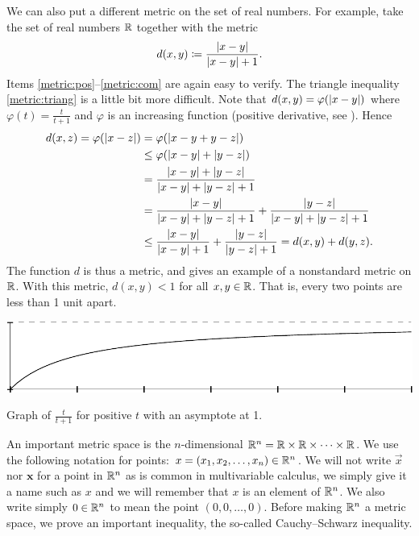 \begin{example}
We can also put a different metric on the set of real numbers.
For example, take the set of real numbers ${\mathbb{R}}$ together with the metric
\begin{equation*}
d(x,y) \coloneqq
\frac{\left\lvert {x-y} \right\rvert}{\left\lvert {x-y} \right\rvert+1} .
\end{equation*}
Items \ref{metric:pos}--\ref{metric:com} are again easy to verify.  The
triangle inequality \ref{metric:triang} is a little bit more difficult.
Note that $d(x,y) = \varphi(\left\lvert {x-y} \right\rvert)$ where $\varphi(t) =
\frac{t}{t+1}$ and $\varphi$ is an increasing function
(positive derivative, see ).
Hence
\begin{equation*}
\begin{split}
d(x,z) = \varphi(\left\lvert {x-z} \right\rvert)
& = 
\varphi(\left\lvert {x-y+y-z} \right\rvert) \\
& \leq
\varphi(\left\lvert {x-y} \right\rvert+\left\lvert {y-z} \right\rvert)
\\
& =
\frac{\left\lvert {x-y} \right\rvert+\left\lvert {y-z} \right\rvert}{\left\lvert {x-y} \right\rvert+\left\lvert {y-z} \right\rvert+1} \\
& =
\frac{\left\lvert {x-y} \right\rvert}{\left\lvert {x-y} \right\rvert+\left\lvert {y-z} \right\rvert+1} +
\frac{\left\lvert {y-z} \right\rvert}{\left\lvert {x-y} \right\rvert+\left\lvert {y-z} \right\rvert+1}
\\
& \leq
\frac{\left\lvert {x-y} \right\rvert}{\left\lvert {x-y} \right\rvert+1} +
\frac{\left\lvert {y-z} \right\rvert}{\left\lvert {y-z} \right\rvert+1} =
d(x,y)+ d(y,z) .
\end{split}
\end{equation*}
The function $d$ is thus a metric, and gives
an example of a nonstandard metric on ${\mathbb{R}}$.  With this metric,
$d(x,y) < 1$ for all $x,y \in {\mathbb{R}}$.  That is,
every two points are less than 1 unit apart.
\begin{myfigureht}
\includegraphics{figures/tovertp1graph}
\caption{Graph of $\frac{t}{t+1}$ for positive $t$ with an asymptote at 1.\label{fig:tovertp1}}
\end{myfigureht}
\end{example}

An important metric space is the
$n$-dimensional \emph{}
${\mathbb{R}}^n = {\mathbb{R}} \times {\mathbb{R}} \times \cdots \times {\mathbb{R}}$.   We use the following
notation for points: $x =(x_1,x_2,\ldots,x_n) \in {\mathbb{R}}^n$.  We will not write
$\vec{x}$ nor $\mathbf{x}$ for a point in ${\mathbb{R}}^n$ as is common in
multivariable calculus,
we simply give it a name such as $x$ and we will remember that $x$
is an element of ${\mathbb{R}}^n$.
We also
write simply $0 \in {\mathbb{R}}^n$ to mean the point $(0,0,\ldots,0)$.  Before
making ${\mathbb{R}}^n$ a metric space, we prove an important inequality, the
so-called Cauchy--Schwarz inequality.


